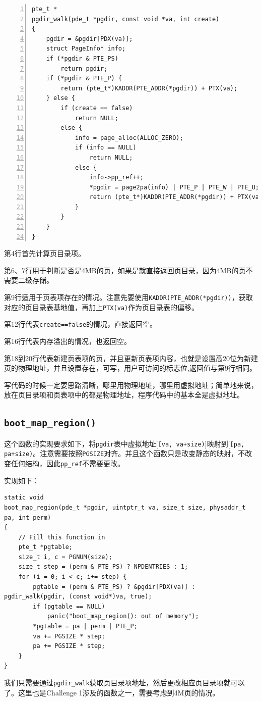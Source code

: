 \documentclass[11pt]{article}
\begin{document}
\begin{lstlisting}[title=kern/pmap.c,numbers=left]
pte_t *
pgdir_walk(pde_t *pgdir, const void *va, int create)
{
	pgdir = &pgdir[PDX(va)];
	struct PageInfo* info;
	if (*pgdir & PTE_PS)
		return pgdir;
	if (*pgdir & PTE_P) {
		return (pte_t*)KADDR(PTE_ADDR(*pgdir)) + PTX(va);
	} else {
		if (create == false)
			return NULL;
		else {
			info = page_alloc(ALLOC_ZERO);
			if (info == NULL)
				return NULL;
			else {
				info->pp_ref++;
				*pgdir = page2pa(info) | PTE_P | PTE_W | PTE_U;
				return (pte_t*)KADDR(PTE_ADDR(*pgdir)) + PTX(va);
			}
		}
	}
}
\end{lstlisting}

第4行首先计算页目录项。

第6、7行用于判断是否是4MB的页，如果是就直接返回页目录，因为4MB的页不需要二级存储。

第9行适用于页表项存在的情况。注意先要使用\lstinline|KADDR(PTE_ADDR(*pgdir))|，获取对应的页目录表基地值，再加上\lstinline|PTX(va)|作为页目录表的偏移。

第12行代表\lstinline|create==false|的情况，直接返回空。

第16行代表内存溢出的情况，也返回空。

第18到20行代表新建页表项的页，并且更新页表项内容，也就是设置高20位为新建页的物理地址，并且设置存在，可写，用户可访问的标志位,返回值与第9行相同。

写代码的时候一定要思路清晰，哪里用物理地址，哪里用虚拟地址；简单地来说，放在页目录项和页表项中的都是物理地址，程序代码中的基本全是虚拟地址。

\subsection{\lstinline|boot_map_region()|}

这个函数的实现要求如下，将\lstinline|pgdir|表中虚拟地址[\lstinline|[va, va+size)|]映射到[\lstinline|[pa, pa+size)|。注意需要按照\lstinline|PGSIZE|对齐。并且这个函数只是改变静态的映射，不改变任何结构，因此\lstinline|pp_ref|不需要更改。

实现如下：
\begin{lstlisting}[title=kern/pmap.c]
static void
boot_map_region(pde_t *pgdir, uintptr_t va, size_t size, physaddr_t pa, int perm)
{
	// Fill this function in
	pte_t *pgtable;
	size_t i, c = PGNUM(size);
	size_t step = (perm & PTE_PS) ? NPDENTRIES : 1;
	for (i = 0; i < c; i+= step) {
		pgtable = (perm & PTE_PS) ? &pgdir[PDX(va)] : pgdir_walk(pgdir, (const void*)va, true);
		if (pgtable == NULL)
			panic("boot_map_region(): out of memory");
		*pgtable = pa | perm | PTE_P;
		va += PGSIZE * step;
		pa += PGSIZE * step;
	}
}
\end{lstlisting}
我们只需要通过\lstinline|pgdir_walk|获取页目录项地址，然后更改相应页目录项就可以了。这里也是Challenge 1涉及的函数之一，需要考虑到4M页的情况。
\end{document}
